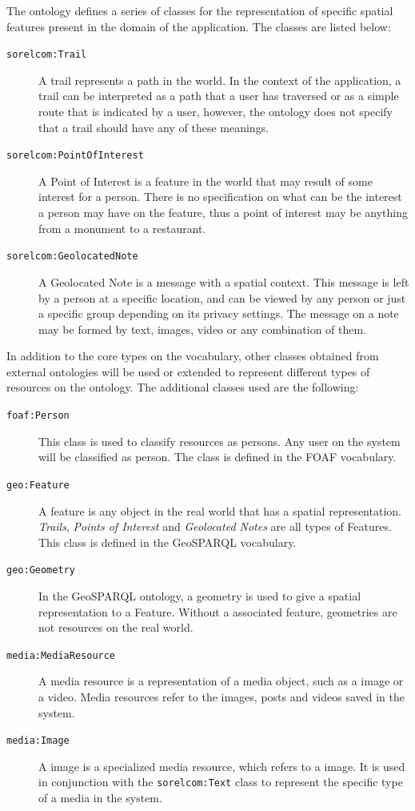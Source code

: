 The ontology defines a series of classes for the representation of specific spatial features present in the domain of the application. The classes are listed below:

\begin{description}
\item[\texttt{sorelcom:Trail}] A trail represents a path in the world. In the context of the application, a trail can be interpreted as a path that a user has traversed or as a simple route that is indicated by a user, however, the ontology does not specify that a trail should have any of these meanings.

\item[\texttt{sorelcom:PointOfInterest}] A Point of Interest is a feature in the world that may result of some interest for a person. There is no specification on what can be the interest a person may have on the feature, thus a point of interest may be anything from a monument to a restaurant.

\item[\texttt{sorelcom:GeolocatedNote}] A Geolocated Note is a message with a spatial context. This message is left by a person at a specific location, and can be viewed by any person or just a specific group depending on its privacy settings. The message on a note may be formed by text, images, video or any combination of them.
\end{description} 

In addition to the core types on the vocabulary, other classes obtained from external ontologies will be used or extended to represent different types of resources on the ontology. The additional classes used are the following:

\begin{description}
\item[\texttt{foaf:Person}] This class is used to classify resources as persons. Any user on the system will be classified as person. The class is defined in the FOAF vocabulary.

\item[\texttt{geo:Feature}] A feature is any object in the real world that has a spatial representation. \textit{Trails}, \textit{Points of Interest} and \textit{Geolocated Notes} are all types of Features. This class is defined in the GeoSPARQL vocabulary.

\item[\texttt{geo:Geometry}] In the GeoSPARQL ontology, a geometry is used to give a spatial representation to a Feature. Without a associated feature, geometries are not resources on the real world.

\item[\texttt{media:MediaResource}] A media resource is a representation of a media object, such as a image or a video. Media resources refer to the images, posts and videos saved in the system.

\item[\texttt{media:Image}] A image is a specialized media resource, which refers to a image. It is used in conjunction with the \texttt{sorelcom:Text} class to represent the specific type of a media in the system.
 
\end{description}

